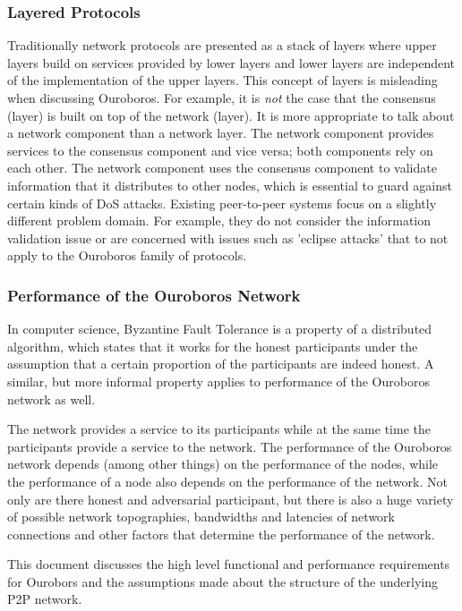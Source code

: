 \documentclass{report}
\theoremstyle{definition}{
  \newtheorem{lemma}{Lemma}[section] %
  \newtheorem{definition}[lemma]{Definition}
}
\theoremstyle{theorem}{
  \newtheorem{invariant}[lemma]{Invariant}
  \newtheorem{proofobligation}[lemma]{Proof Obligation}
}
\numberwithin{equation}{lemma}
\begin{document}
\subsubsection{Layered Protocols}
Traditionally network protocols are presented as a stack of layers where
upper layers build on services provided by lower layers and lower layers
are independent of the implementation of the upper layers.
This concept of layers is misleading when discussing Ouroboros.
For example, it is {\em not} the case that the consensus (layer)
is built on top of the network (layer).
It is more appropriate to talk about a network component than a network layer.
The network component provides services to the consensus component and vice versa;
both components rely on each other.
The network component uses the consensus component to validate
information that it distributes to other nodes, which
is essential to guard against certain kinds of DoS attacks.
Existing peer-to-peer systems focus on a slightly different problem domain.
For example, they do not consider the information validation issue
or are concerned with issues such as 'eclipse attacks' that to not
apply to the Ouroboros family of protocols.


\subsubsection{Performance of the Ouroboros Network}
In computer science, Byzantine Fault Tolerance is a property of a distributed algorithm, which states
that it works for the honest participants
under the assumption that a certain proportion of the participants are indeed honest.
A similar, but more informal property applies to performance of the Ouroboros network as well.

The network provides a service to its participants while at the same
time the participants provide a service to the network.
The performance of the Ouroboros network depends (among other things) on the performance of the nodes,
while the performance of a node also depends on the performance of the network.
Not only are there honest and adversarial participant, but there is also a huge variety of
possible network topographies, bandwidths and latencies of network connections and other
factors that determine the performance of the network.

This document discusses the high level functional and performance requirements for Ourobors and the
assumptions made about the structure of the underlying P2P network.
\end{document}
